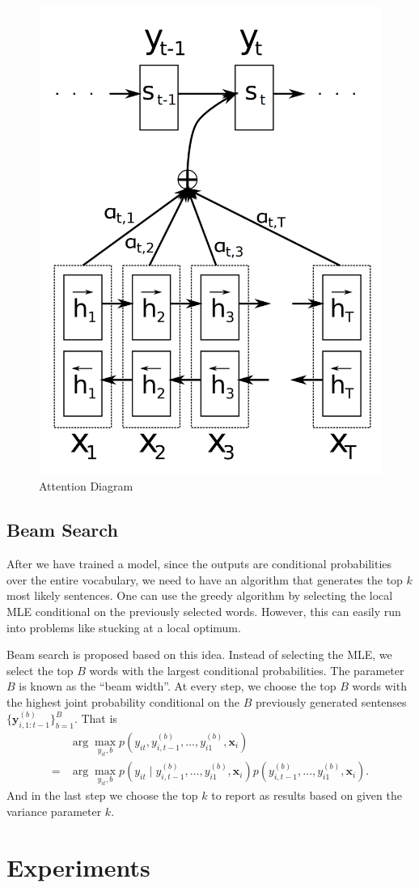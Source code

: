 \documentclass[12pt]{article}
\begin{document}
\begin{figure}
	\centering
	\includegraphics[width=0.4\linewidth]{figs/attn_diagram}
	\caption{Attention Diagram}
	\label{attn_diagram}
\end{figure}


\subsection{Beam Search}
\label{sub:beam}
After we have trained a model, since the outputs are conditional probabilities over the entire vocabulary, we need to have an algorithm that generates the top $k$ most likely sentences. One can use the greedy algorithm by selecting the local MLE conditional on the previously selected words. However, this can easily run into problems like stucking at a local optimum.

Beam search is proposed based on this idea. Instead of selecting the MLE, we select the top $B$ words with the largest conditional probabilities. The parameter $B$ is known as the ``beam width''. At every step, we choose the top $B$ words with the highest joint probability conditional on the $B$ previously generated sentenses $\{\bm y_{i, 1:t-1}^{(b)}\}_{b=1}^B$. That is
\begin{align}
	&\arg \max_{y_{it}, b} p(y_{it}, y_{i,t-1}^{(b)}, \dots, y_{i1}^{(b)}, \bm x_i)\nonumber\\
	=& \arg \max_{y_{it}, b} p(y_{it} \mid y_{i,t-1}^{(b)}, \dots, y_{i1}^{(b)}, \bm x_i) p(y_{i,t-1}^{(b)}, \dots, y_{i1}^{(b)}, \bm x_i).
\end{align}
And in the last step we choose the top $k$ to report as results based on given the variance parameter $k$.

\section{Experiments}
\end{document}
